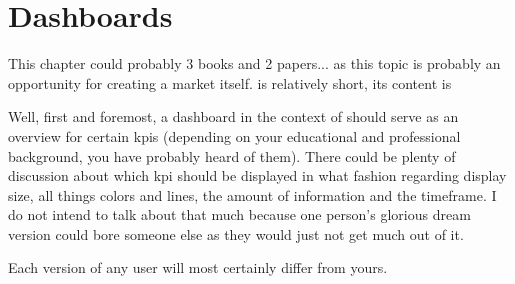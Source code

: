\section{Dashboards}
\label{sec:dashboards}

This chapter could probably 3 books and 2 papers... as this topic is probably an opportunity for creating a market itself.
is relatively short, its content is 

Well, first and foremost, a dashboard in the context of \tfn should serve as an overview for certain \acp{kpi} (depending on your educational and professional background, you have probably heard of them).
There could be plenty of discussion about which \ac{kpi} should be displayed in what fashion regarding display size, all things colors and lines, the amount of information and the timeframe.
I do not intend to talk about that much because one person's glorious dream version could bore someone else as they would just not get much out of it.

Each version of any user will most certainly differ from yours.